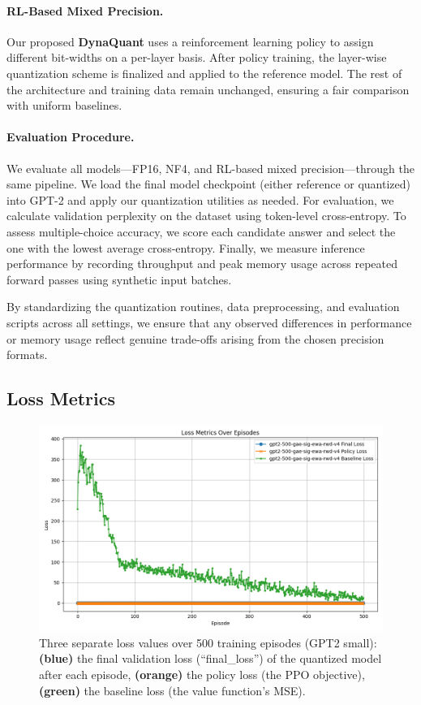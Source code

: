 \documentclass{article}
\begin{document}
	\paragraph{RL-Based Mixed Precision.}
	Our proposed \textbf{DynaQuant} uses a reinforcement learning policy to assign different bit-widths on a per-layer basis. After policy training, the layer-wise quantization scheme is finalized and applied to the reference model. The rest of the architecture and training data remain unchanged, ensuring a fair comparison with uniform baselines.
	
	\paragraph{Evaluation Procedure.}
	We evaluate all models---FP16, NF4, and RL-based mixed precision---through the same pipeline. We load the final model checkpoint (either reference or quantized) into GPT-2 and apply our quantization utilities as needed. For evaluation, we calculate validation perplexity on the dataset using token-level cross-entropy. To assess multiple-choice accuracy, we score each candidate answer and select the one with the lowest average cross-entropy. Finally, we measure inference performance by recording throughput and peak memory usage across repeated forward passes using synthetic input batches.
	
	By standardizing the quantization routines, data preprocessing, and evaluation scripts across all settings, we ensure that any observed differences in performance or memory usage reflect genuine trade-offs arising from the chosen precision formats.
	
	\subsection{Loss Metrics}
	\begin{figure}[ht]
		\centering
		\includegraphics[width=\columnwidth]{gpt2-500-gae-sig-ewa-rwd-v4-losses.png}
		\vspace{-1em}
		\caption{\small
			Three separate loss values over 500 training episodes (GPT2 small):
			\textbf{(blue)} the final validation loss (``final\_loss'') of the quantized model after each episode,
			\textbf{(orange)} the policy loss (the PPO objective),
			\textbf{(green)} the baseline loss (the value function’s MSE).}
		\label{fig:loss_curves}
		\vspace{-0.2em}
	\end{figure}
	
\end{document}
